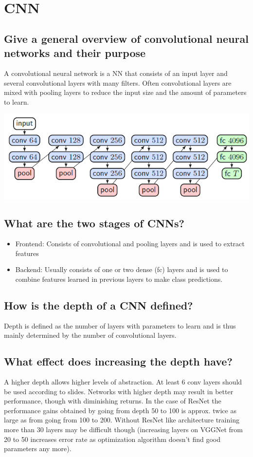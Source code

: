\section{CNN}
\subsection{Give a general overview of convolutional neural networks and their purpose}
A convolutional neural network is a NN that consists of an input layer and several convolutional layers with many filters. Often convolutional layers are mixed with pooling layers to reduce the input size and the amount of parameters to learn. 
\begin{minipage}{0.5\textwidth}
\includegraphics[width=\textwidth]{./img/cnn.PNG}
\end{minipage}
\begin{minipage}{0.5\textwidth}
\subsection{What are the two stages of CNNs?}
\begin{itemize}
\item Frontend: Consists of convolutional and pooling layers and is used to extract features
\item Backend: Usually consists of one or two dense (fc) layers and is used to combine features learned in previous layers to make class predictions. 
\end{itemize}
\end{minipage}

\subsection{How is the depth of a CNN defined?}
Depth is defined as the number of layers with parameters to learn and is thus mainly determined by the number of convolutional layers.
\subsection{What effect does increasing the depth have?}
A higher depth allows higher levels of abstraction. At least $6$ conv layers should be used according to slides. Networks with higher depth may result in better performance, though with diminishing returns. In the case of ResNet the performance gains obtained by going from depth 50 to 100 is approx. twice as large as from going from 100 to 200. Without ResNet like architecture training more than 30 layers may be difficult though (increasing layers on VGGNet from 20 to 50 increases error rate as optimization algorithm doesn't find good parameters any more).
